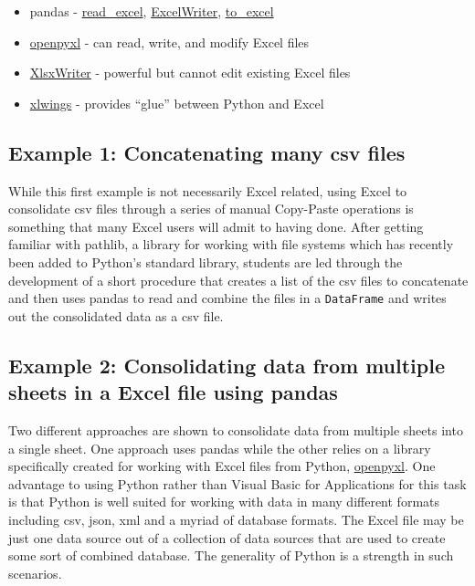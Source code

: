 \documentclass[ited,blindrev]{informs3}              %
\newcommand{\code}[1]{\texttt{#1}}
\begin{document}
\begin{itemize}
	\item
	pandas -
	\href{https://pandas.pydata.org/docs/reference/api/pandas.read_excel.html}{read\_excel},
	\href{https://pandas.pydata.org/docs/reference/api/pandas.ExcelWriter.html}{ExcelWriter},
	\href{https://pandas.pydata.org/docs/reference/api/pandas.DataFrame.to_excel.html}{to\_excel}
	\item
	\href{https://openpyxl.readthedocs.io/en/stable/}{openpyxl} - can
	read, write, and modify Excel files
	\item
	\href{https://xlsxwriter.readthedocs.io/}{XlsxWriter} - powerful but
	cannot edit existing Excel files
	\item
	\href{https://www.xlwings.org/}{xlwings} - provides ``glue'' between
	Python and Excel
\end{itemize}


\subsection{Example 1: Concatenating many csv files}

While this first example is not necessarily Excel related, using Excel to consolidate csv files through a series of manual Copy-Paste operations is something that many Excel users will admit to having done. After getting familiar with pathlib, a library for working with file systems which has recently been added to Python's standard library, students are led through the development of a short procedure that creates a list of the csv files to concatenate and then uses pandas to read and combine the files in a \code{DataFrame} and writes out the consolidated data as a csv file.

\subsection{Example 2: Consolidating data from multiple sheets in a Excel file using pandas}

Two different approaches are shown to consolidate data from multiple sheets into a single sheet. One approach uses pandas while the other relies on a library specifically created for working with Excel files from Python, \href{https://openpyxl.readthedocs.io/en/stable/}{openpyxl}. One advantage to using Python rather than Visual Basic for Applications for this task is that Python is well suited for working with data in many different formats including csv, json, xml and a myriad of database formats. The Excel file may be just one data source out of a collection of data sources that are used to create some sort of combined database. The generality of Python is a strength in such scenarios.
\end{document}
